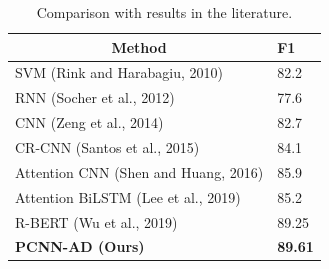 \documentclass[conference]{IEEEtran}
\begin{document}
\begin{table}[h]
\caption{\label{F1} Comparison with results in the literature.}
  \centering
  \begin{tabular}{|l|l|}
  \hline
  \multicolumn{1}{|c|}{Method} & F1   \\ \hline
  SVM (Rink and Harabagiu, 2010) \cite{Rink} & 82.2 \\ \hline
  RNN (Socher et al., 2012) \cite{socher2012semantic} & 77.6 \\ \hline
  CNN (Zeng et al., 2014) \cite{zeng2014relation} & 82.7 \\ \hline
  CR-CNN (Santos et al., 2015) \cite{dos-santos-etal-2015-classifying} & 84.1 \\ \hline
  Attention CNN (Shen and Huang, 2016) \cite{shen-huang-2016-attention} & 85.9 \\ \hline
  Attention BiLSTM (Lee et al., 2019) \cite{DBLP:journals/corr/abs-1901-08163} & 85.2 \\ \hline
  R-BERT (Wu et al., 2019) \cite{DBLP:journals/corr/abs-1905-08284} & 89.25 \\ \hline
  \textbf{PCNN-AD (Ours)}          & \textbf{89.61} \\ \hline
  \end{tabular}

  \end{table}
\end{document}
